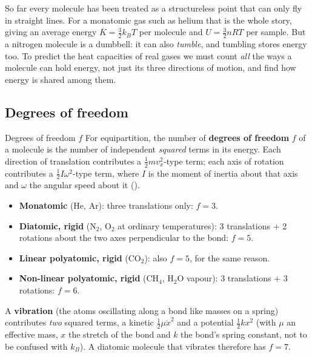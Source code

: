 So far every molecule has been treated as a structureless point that can only fly in straight lines.
For a monatomic gas such as helium that is the whole story, giving an average energy
$\overline K = \tfrac32 k_BT$ per molecule and $U=\tfrac32nRT$ per sample. But a nitrogen molecule is a dumbbell: it can also \emph{tumble}, and tumbling stores
energy too. To predict the heat capacities of real gases we must count \emph{all} the ways a molecule can
hold energy, not just its three directions of motion, and find how energy is shared among them.

\subsection{Degrees of freedom}

\begin{defbox}{Degrees of freedom $f$}
For equipartition, the number of \textbf{degrees of freedom} $f$ of a molecule is the number of
independent \emph{squared} terms in its energy. Each direction of translation contributes a
$\tfrac12mv_x^2$-type term; each axis of rotation contributes a $\tfrac12I\omega^2$-type term, where $I$
is the moment of inertia about that axis and $\omega$ the angular speed about it ().
\begin{itemize}
\item \textbf{Monatomic} (He, Ar): three translations only: $f = 3$.
\item \textbf{Diatomic, rigid} (N$_2$, O$_2$ at ordinary temperatures): 3 translations $+$ 2 rotations
      about the two axes perpendicular to the bond: $f = 5$.
\item \textbf{Linear polyatomic, rigid} (CO$_2$): also $f=5$, for the same reason.
\item \textbf{Non-linear polyatomic, rigid} (CH$_4$, H$_2$O vapour): 3 translations $+$ 3 rotations:
      $f = 6$.
\end{itemize}
A \textbf{vibration} (the atoms oscillating along a bond like masses on a spring) contributes
\emph{two} squared terms, a kinetic $\tfrac12\mu\dot x^2$ and a potential $\tfrac12kx^2$ (with $\mu$ an
effective mass, $x$ the stretch of the bond and $k$ the bond's spring constant, not to be confused with
$k_B$). A diatomic molecule that vibrates therefore has $f=7$.
\end{defbox}

